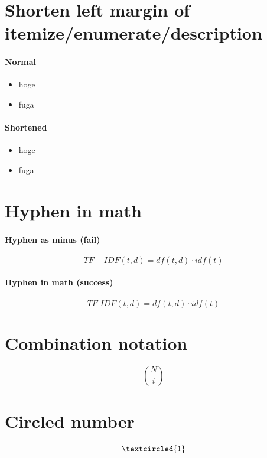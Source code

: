 \documentclass{article}
\begin{document}
\section{Shorten left margin of itemize/enumerate/description}

\paragraph{Normal}

\begin{itemize}
	\item hoge
	\item fuga
\end{itemize}

\paragraph{Shortened}

\begin{itemize}[leftmargin=*]
	\item hoge
	\item fuga
\end{itemize}


\section{Hyphen in math}

\paragraph{Hyphen as minus (fail)}

\[ TF-IDF(t, d) = df(t, d) \cdot idf(t) \]

\paragraph{Hyphen in math (success)}

\[ TF\mbox{-}IDF(t, d) = df(t, d) \cdot idf(t) \]


\section{Combination notation}

\[ N\choose{i} \]


\section{Circled number}

\[\textcircled{\scriptsize 1}\]
\end{document}
